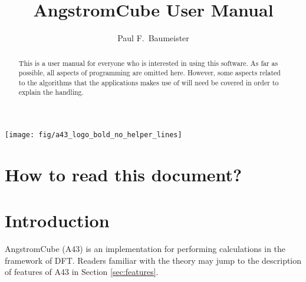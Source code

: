 \documentclass[oribibl]{llncs}
\newcommand{\fullcodename}{AngstromCube}
\newcommand{\codename}{A43}
\begin{document}
\pagestyle{plain}

\title       {\fullcodename{} User Manual}
\titlerunning{\codename{} User Manual}

\author{%
  Paul F.~Baumeister %
}


\maketitle

\begin{figure*}
	\centering
	\texttt{[image: fig/a43\_logo\_bold\_no\_helper\_lines]} %
\end{figure*}

\begin{abstract}
This is a user manual for everyone who is interested in using
this software.
As far as possible, all aspects of programming are omitted here.
However, some aspects related to the algorithms that the applications 
makes use of will need be covered in order to explain the handling.
\end{abstract}

\section*{How to read this document?}

\newpage

\tableofcontents

\newpage

\section{Introduction} \label{sec:intro}
%
\fullcodename{} (\codename{}) is an implementation for performing calculations 
in the framework of \ac{DFT}.
Readers familiar with the theory may jump to the description of 
features of \codename{} in Section \ref{sec:features}.
\end{document}
